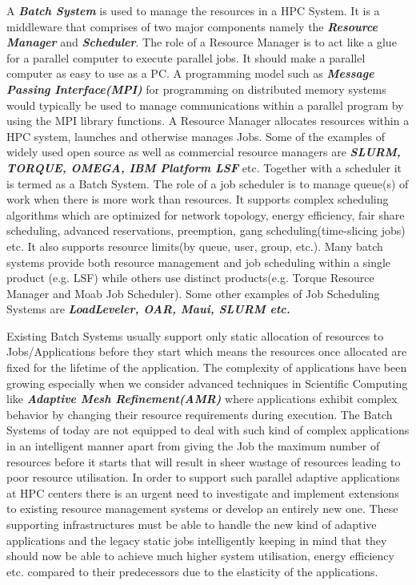 \noindent
A \textbf{\textit{Batch System}} is used to manage the resources in a HPC System. It is a middleware that comprises of two major components namely the \textbf{\textit{Resource Manager}} and \textbf{\textit{Scheduler}}. The role of a Resource Manager is to act like a glue for a parallel computer to execute parallel jobs. It should make a parallel computer as easy to use as a PC. A programming model such as \textbf{\textit{Message Passing Interface(MPI)}} for programming on distributed memory systems would typically be used to manage communications within a parallel program by using the MPI library functions. A Resource Manager allocates resources within a HPC system, launches and otherwise manages Jobs. Some of the examples of widely used open source as well as commercial resource managers are \textbf{\textit{SLURM, TORQUE, OMEGA, IBM Platform LSF}} etc. Together with a scheduler it is termed as a Batch System. The role of a job scheduler is to manage queue(s) of work when there is more work than resources. It supports complex scheduling algorithms which are optimized for network topology, energy efficiency, fair share scheduling, advanced reservations, preemption, gang scheduling(time-slicing jobs) etc. It also supports resource limits(by queue, user, group, etc.). Many batch systems provide both resource management and job scheduling within a single product (e.g. LSF) while others use distinct products(e.g. Torque Resource Manager and Moab Job Scheduler). Some other examples of Job Scheduling Systems are \textbf{\textit{LoadLeveler, OAR, Maui, SLURM etc.}}\\ \par
\noindent
Existing Batch Systems usually support only static allocation of resources to Jobs/Applications before they start which means the resources once allocated are fixed for the lifetime of the application. The complexity of applications have been growing especially when we consider advanced techniques in Scientific Computing like \textbf{\textit{Adaptive Mesh Refinement(AMR)}} where applications exhibit complex behavior by changing their resource requirements during execution. The Batch Systems of today are not equipped to deal with such kind of complex applications in an intelligent manner apart from giving the Job the maximum number of resources before it starts that will result in sheer wastage of resources leading to poor resource utilisation. In order to support such parallel adaptive applications at HPC centers there is an urgent need to investigate and implement extensions to existing resource management systems or develop an entirely new one. These supporting infrastructures must be able to handle the new kind of adaptive applications and the legacy static jobs intelligently keeping in mind that they should now be able to achieve much higher system utilisation, energy efficiency etc. compared to their predecessors due to the elasticity of the applications.

